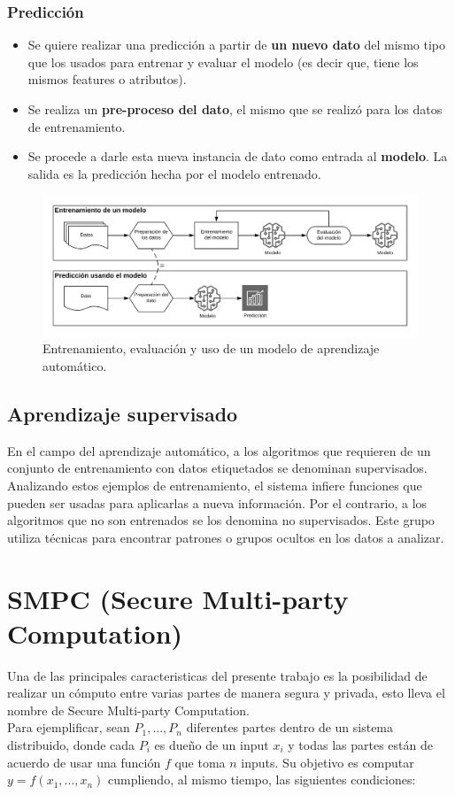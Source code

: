\documentclass[
11pt, %
oneside, %
spanish, %
singlespacing, %
parskip, %
headsepline, %
chapterinoneline, %
]{MastersDoctoralThesis} %
\begin{document}
\subsubsection*{Predicción}
\begin{itemize}
\item Se quiere realizar una predicción a partir de \textbf{un nuevo dato} del mismo tipo que los usados para entrenar y evaluar el modelo (es decir que, tiene los mismos features o atributos).
\item Se realiza un \textbf{pre-proceso del dato}, el mismo que se realizó para los datos de entrenamiento.
\item Se procede a darle esta nueva instancia de dato como entrada al \textbf{modelo}. La salida es la predicción hecha por el modelo entrenado.
\end{itemize}

\begin{figure}[H]
  	\centering
	\includegraphics[scale=0.15]{imgs/ml-processes.png}
	\caption{Entrenamiento, evaluación y uso de un modelo de aprendizaje automático.}
\end{figure}

\subsection{Aprendizaje supervisado}
En el campo del aprendizaje automático, a los algoritmos que requieren de un conjunto de entrenamiento con datos etiquetados se denominan supervisados. Analizando estos ejemplos de entrenamiento, el sistema infiere funciones que pueden ser usadas para aplicarlas a nueva información.
Por el contrario, a los algoritmos que no son entrenados se los denomina no supervisados. Este grupo utiliza técnicas para encontrar patrones o grupos ocultos en los datos a analizar.


\section{SMPC (Secure Multi-party Computation)}
\justify
Una de las principales caracteristicas del presente trabajo es la posibilidad de realizar un c\'omputo entre varias partes de manera segura y privada, esto lleva el nombre de Secure Multi-party Computation. \\ 
Para ejemplificar, sean $P_{1},...,P_{n}$ diferentes partes dentro de un sistema distribuido, donde cada $P_{i}$ es dueño de un input $x_{i}$ y todas las partes están de acuerdo de usar una función $f$ que toma $n$ inputs. Su objetivo es computar $y = f(x_{1},...,x_{n})$ cumpliendo, al mismo tiempo, las siguientes condiciones:
\end{document}
